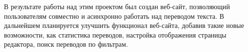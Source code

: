 \documentclass[a4paper,12pt]{article}
\begin{document}
В результате работы над этим проектом был создан веб-сайт, позволяющий пользователям совместно и асинхронно работать над переводом текста. В дальнейшем планируется улучшить функционал веб-сайта, добавив такие новые возможности, как статистика переводов, настройка отображения страницы редактора, поиск переводов по фильтрам.





\newpage
{}



 
\end{document}

